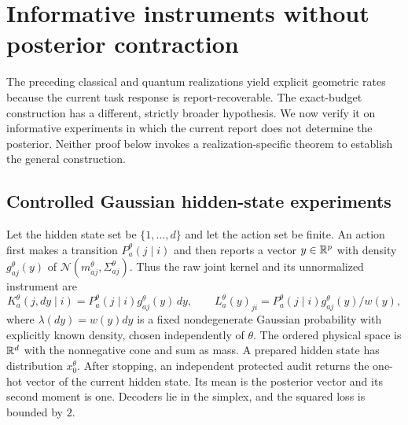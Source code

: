 \section{Informative instruments without posterior contraction}\label{sec:effective-realizations}
The preceding classical and quantum realizations yield explicit geometric rates because the current task response is report-recoverable. The exact-budget construction has a different, strictly broader hypothesis. We now verify it on informative experiments in which the current report does not determine the posterior. Neither proof below invokes a realization-specific theorem to establish the general construction.

\subsection{Controlled Gaussian hidden-state experiments}
Let the hidden state set be $\{1,\ldots,d\}$ and let the action set be finite. An action first makes a transition $P_a^\theta(j\mid i)$ and then reports a vector $y\in\mathbb R^p$ with density $g_{aj}^\theta(y)$ of $\mathcal N(m_{aj}^\theta,\Sigma_{aj}^\theta)$. Thus the raw joint kernel and its unnormalized instrument are
\begin{equation}\label{eq:effective-gaussian}
 K_a^\theta(j,dy\mid i)=P_a^\theta(j\mid i)g_{aj}^\theta(y)\,dy,
 \qquad L_a^\theta(y)_{ji}
       =P_a^\theta(j\mid i)g_{aj}^\theta(y)/w(y),
\end{equation}
where $\lambda(dy)=w(y)dy$ is a fixed nondegenerate Gaussian probability with explicitly known density, chosen independently of $\theta$. The ordered physical space is $\mathbb R^d$ with the nonnegative cone and sum as mass. A prepared hidden state has distribution $x_0^\theta$. After stopping, an independent protected audit returns the one-hot vector of the current hidden state. Its mean is the posterior vector and its second moment is one. Decoders lie in the simplex, and the squared loss is bounded by $2$.

